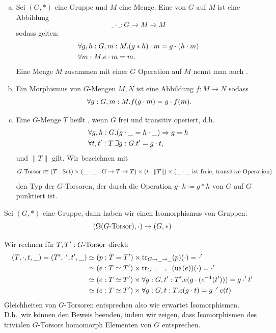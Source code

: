 \begin{definition}
  \begin{enumerate}[(a)]
  \item Sei $(G,\ast)$ eine Gruppe und $M$ eine Menge.
  Eine  von $G$ auf $M$ ist eine Abbildung
  \[
    \_\cdot\_ : G \to M\to M
    \]
    sodass gelten:
    \begin{align*}
      & \forall g,h:G, m:M. (g \ast h) \cdot m = g \cdot (h \cdot m) \\
      & \forall m:M. e\cdot m = m\rlap{.}
    \end{align*}
    Eine Menge $M$ zusammen mit einer $G$ Operation auf $M$ nennt man auch .
  \item Ein Morphismus von $G$-Mengen $M,N$ ist eine Abbildung $f:M\to N$ sodass
    \[
      \forall g:G, m:M. f(g\cdot m)=g\cdot f(m)\rlap{.}
    \]
  \item Eine $G$-Menge $T$ heißt , wenn $G$ frei und transitiv operiert, d.h.\
    \begin{align*}
      & \forall g,h:G. (g\cdot\_=h\cdot\_) \Rightarrow g=h\\
      & \forall t,t^\prime:T. \exists g:G. t^\prime = g\cdot t\rlap{,}
    \end{align*}
    und $\|T\|$ gilt.
    Wir bezeichnen mit
    \[
    G\mbox{-}\mathrm{Torsor}\vcentcolon\mspace{-1.2mu}\equiv (T:\mathrm{Set})\times (\_\cdot\_:G\to T\to T)\times (t:\|T\|)\times (\text{$\_\cdot\_$ ist freie, transitive Operation})\]
    \index{$\Tors{G}$} den Typ der $G$-Torsoren,
    der durch die Operation $g\cdot h\coloneq g\ast h$ von $G$ auf $G$ punktiert ist.
  \end{enumerate}
\end{definition}

\begin{satz}
  Sei $(G,\ast)$ eine Gruppe, dann haben wir einen Isomorphismus von Gruppen:
  \[
     (\Omega(\Tors{G}),\kon) \to (G,\ast)
  \]
\end{satz}

\begin{beweis}
  Wir rechnen für $T,T^\prime:G\mbox{-}\mathrm{Torsor}$ direkt:
  \begin{align*}
    (T,\cdot,t,\_)=(T^\prime,\cdot^\prime,t^\prime,\_) &\simeq (p:T=T^\prime) \times \mathrm{tr}_{G\to\_\to\_}(p)(\cdot)=\cdot^\prime \\
    &\simeq  (e:T\simeq T^\prime)\times \mathrm{tr}_{G\to\_\to\_}(\mathrm{ua}(e))(\cdot)=\cdot^\prime \\
    &\simeq  (e:T\simeq T^\prime)\times \forall g:G,t^\prime:T^\prime. e(g\cdot (e^{-1}(t^\prime)))=g\cdot^\prime t^\prime \\
    &\simeq  (e:T\simeq T^\prime)\times \forall g:G,t:T. e(g\cdot t)=g\cdot^\prime e(t)
  \end{align*}
  Gleichheiten von $G$-Torsoren entsprechen also wie erwartet Isomorphismen.
  D.h.\ wir können den Beweis beenden, indem wir zeigen, dass Isomorphismen des trivialen $G$-Torsors homomorph Elementen von $G$ entsprechen.
\end{beweis}

